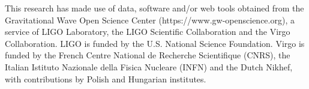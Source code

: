 \documentclass[pra,superscriptaddress,reprint,amsmath,amssymb,nofootinbib]{revtex4-2}
\begin{document}
%




\begin{acknowledgements}
This research has made use of data, software and/or web tools obtained from the Gravitational Wave Open Science Center (https://www.gw-openscience.org), a service of LIGO Laboratory, the LIGO Scientific Collaboration and the Virgo Collaboration. LIGO is funded by the U.S. National Science Foundation. Virgo is funded by the French Centre National de Recherche Scientifique (CNRS), the Italian Istituto Nazionale della Fisica Nucleare (INFN) and the Dutch Nikhef, with contributions by Polish and Hungarian institutes.
\end{acknowledgements}
\end{document}

